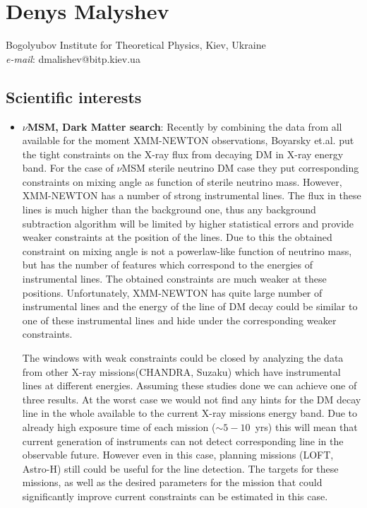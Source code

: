 \documentclass{article} \oddsidemargin -0,05 cm \textwidth
\begin{document}
\section*{ Denys Malyshev}
 \noindent
Bogolyubov Institute for Theoretical Physics, Kiev, Ukraine\\
\emph{e-mail}: dmalishev@bitp.kiev.ua

\subsection*{Scientific interests}
\begin{itemize}
\item \textbf{$\nu$MSM, Dark Matter search}: Recently by combining the data from all available for the moment XMM-NEWTON observations, Boyarsky et.al. put the tight constraints on the X-ray flux from decaying DM in X-ray energy band. For the case of $\nu$MSM sterile neutrino DM case they put corresponding constraints on mixing angle as function of sterile neutrino mass. However, XMM-NEWTON has a number of strong instrumental lines. The flux in these lines is much higher than the background one, thus any background subtraction algorithm will be limited by higher statistical errors and provide weaker constraints at the position of the lines. Due to this the obtained constraint on mixing angle is not a powerlaw-like function of neutrino mass, but has the number of features which correspond to the energies of instrumental lines. The obtained constraints are much weaker at these positions. Unfortunately, XMM-NEWTON has quite large number of instrumental lines and the energy of the line of DM decay could be similar to one of these instrumental lines and hide under the corresponding weaker constraints.

    The windows with weak constraints could be closed by analyzing the data from other X-ray missions(CHANDRA, Suzaku) which have instrumental lines at different energies. Assuming these studies done we can achieve one of three results. At the worst case we would not find any hints for the DM decay line in the whole available to the current X-ray missions energy band. Due to already high exposure time of each mission ($\sim 5-10$~yrs) this will mean that current generation of instruments can not detect corresponding line in the observable  future. However even in this case, planning missions (LOFT, Astro-H) still could be useful for the line detection. The targets for these missions, as well as the desired parameters for the mission that could significantly improve current constraints can be estimated in this case.


\end{itemize}
\end{document}
